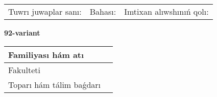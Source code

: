 \documentclass{article}
\begin{document}
\vspace{1cm}

\begin{tabular}{lll}
Tuwrı juwaplar sanı: \underline{\hspace{1.5cm}} & 
Bahası: \underline{\hspace{1.5cm}} & 
Imtixan alıwshınıń qolı: \underline{\hspace{2cm}} \\
\end{tabular}

\egroup

\newpage


\textbf{92-variant}\\

\bgroup
\def\arraystretch{1.6} %

\begin{tabular}{|m{5.7cm}|m{9.5cm}|}
\hline
Familiyası hám atı & \\
\hline
Fakulteti  & \\
\hline
Toparı hám tálim baǵdarı  & \\
\hline
\end{tabular}

\vspace{1cm}
\end{document}
